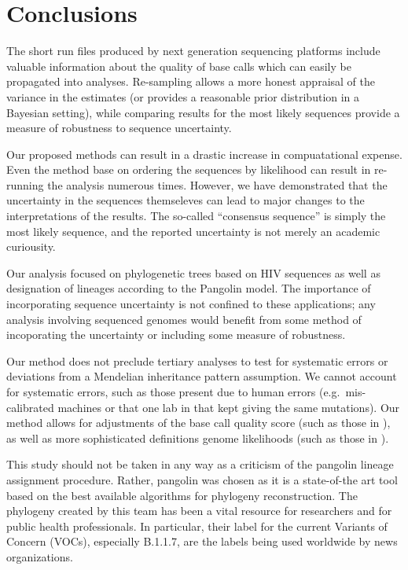 \documentclass[
]{article}
\begin{document}
\hypertarget{conclusions}{%
\section{Conclusions}\label{conclusions}}

The short run files produced by next generation sequencing platforms
include valuable information about the quality of base calls which can
easily be propagated into analyses. Re-sampling allows a more honest
appraisal of the variance in the estimates (or provides a reasonable
prior distribution in a Bayesian setting), while comparing results for
the most likely sequences provide a measure of robustness to sequence
uncertainty.

Our proposed methods can result in a drastic increase in compuatational
expense. Even the method base on ordering the sequences by likelihood
can result in re-running the analysis numerous times. However, we have
demonstrated that the uncertainty in the sequences themseleves can lead
to major changes to the interpretations of the results. The so-called
``consensus sequence'' is simply the most likely sequence, and the
reported uncertainty is not merely an academic curiousity.

Our analysis focused on phylogenetic trees based on HIV sequences as
well as designation of lineages according to the Pangolin model. The
importance of incorporating sequence uncertainty is not confined to
these applications; any analysis involving sequenced genomes would
benefit from some method of incoporating the uncertainty or including
some measure of robustness.

Our method does not preclude tertiary analyses to test for systematic
errors or deviations from a Mendelian inheritance pattern assumption. We
cannot account for systematic errors, such as those present due to human
errors (e.g.~mis-calibrated machines or that one lab in \citet{blank}
that kept giving the same mutations). Our method allows for adjustments
of the base call quality score (such as those in \citet{blank}), as well
as more sophisticated definitions genome likelihoods (such as those in
\citet{blank2}).

This study should not be taken in any way as a criticism of the pangolin
lineage assignment procedure. Rather, pangolin was chosen as it is a
state-of-the art tool based on the best available algorithms for
phylogeny reconstruction. The phylogeny created by this team has been a
vital resource for researchers and for public health professionals. In
particular, their label for the current Variants of Concern (VOCs),
especially B.1.1.7, are the labels being used worldwide by news
organizations.
\end{document}
